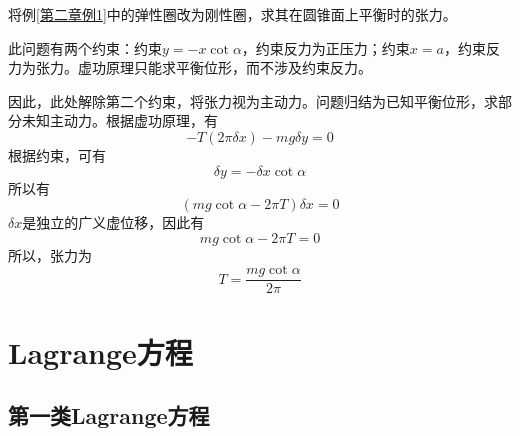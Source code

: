 \begin{example}
将例\ref{第二章例1}中的弹性圈改为刚性圈，求其在圆锥面上平衡时的张力。
\end{example}
\begin{solution}
此问题有两个约束：约束$y=-x\cot\alpha$，约束反力为正压力；约束$x=a$，约束反力为张力。虚功原理只能求平衡位形，而不涉及约束反力。

因此，此处解除第二个约束，将张力视为主动力。问题归结为已知平衡位形，求部分未知主动力。根据虚功原理，有
\begin{equation*}
	-T(2\pi \delta x) - mg\delta y = 0
\end{equation*}
根据约束，可有
\begin{equation*}
	\delta y = -\delta x \cot \alpha
\end{equation*}
所以有
\begin{equation*}
	(mg\cot \alpha - 2\pi T) \delta x = 0
\end{equation*}
$\delta x$是独立的广义虚位移，因此有
\begin{equation*}
	mg\cot \alpha - 2\pi T = 0
\end{equation*}
所以，张力为
\begin{equation*}
	T = \frac{mg\cot \alpha}{2\pi}
\end{equation*}
\end{solution}

\section{Lagrange方程}

\subsection{第一类Lagrange方程}

